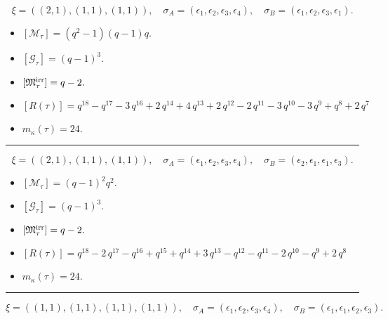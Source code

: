 \documentclass[10pt,a4paper]{amsart}
\begin{document}
$$\xi = ({(2, 1)}, {(1, 1)}, {(1, 1)}),\quad \sigma_A = ({{\epsilon_1, \epsilon_2}}, {{\epsilon_3}}, {{\epsilon_4}}),\quad \sigma_B = ({{\epsilon_1, \epsilon_2}}, {{\epsilon_3}}, {{\epsilon_1}}).$$

\begin{itemize}
 \item $[\mathcal{M}_{\tau}] = {\left(q^{2} - 1\right)} {\left(q - 1\right)} q .$

 \item $[\mathcal{G}_{\tau}] = {\left(q - 1\right)}^{3} .$

 \item $[{\frak M}_{\tau}^{\textrm{irr}}] = q - 2 .$

 \item $[R(\tau)] = q^{18} - q^{17} - 3 \, q^{16} + 2 \, q^{14} + 4 \, q^{13} + 2 \, q^{12} - 2 \, q^{11} - 3 \, q^{10} - 3 \, q^{9} + q^{8} + 2 \, q^{7} $

 \item $m_{\kappa}(\tau) = 24 .$

 \end{itemize}
\noindent\rule{8cm}{0.4pt}

$$\xi = ({(2, 1)}, {(1, 1)}, {(1, 1)}),\quad \sigma_A = ({{\epsilon_1, \epsilon_2}}, {{\epsilon_3}}, {{\epsilon_4}}),\quad \sigma_B = ({{\epsilon_2, \epsilon_1}}, {{\epsilon_1}}, {{\epsilon_3}}).$$

\begin{itemize}
 \item $[\mathcal{M}_{\tau}] = {\left(q - 1\right)}^{2} q^{2} .$

 \item $[\mathcal{G}_{\tau}] = {\left(q - 1\right)}^{3} .$

 \item $[{\frak M}_{\tau}^{\textrm{irr}}] = q - 2 .$

 \item $[R(\tau)] = q^{18} - 2 \, q^{17} - q^{16} + q^{15} + q^{14} + 3 \, q^{13} - q^{12} - q^{11} - 2 \, q^{10} - q^{9} + 2 \, q^{8} $

 \item $m_{\kappa}(\tau) = 24 .$

 \end{itemize}
\noindent\rule{8cm}{0.4pt}

$$\xi = ({(1, 1), (1, 1)}, {(1, 1)}, {(1, 1)}),\quad \sigma_A = ({{\epsilon_1}, {\epsilon_2}}, {{\epsilon_3}}, {{\epsilon_4}}),\quad \sigma_B = ({{\epsilon_1}, {\epsilon_1}}, {{\epsilon_2}}, {{\epsilon_3}}).$$
\end{document}
